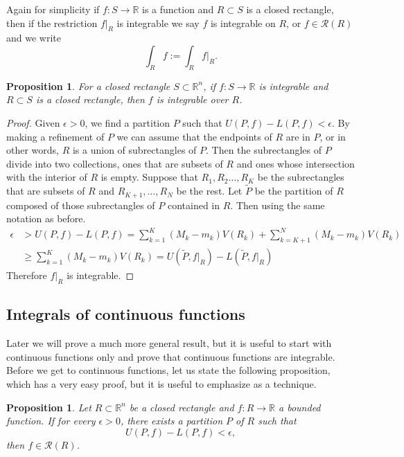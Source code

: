 \documentclass[12pt]{book}
\newcommand{\R}{{\mathbb{R}}}
\newcommand{\sR}{{\mathcal{R}}}
\theoremstyle{plain}
\newtheorem{prop}[thm]{Proposition}
\theoremstyle{remark}
\theoremstyle{definition}
\theoremstyle{exercise}
\theoremstyle{example}
\begin{document}
Again for simplicity if $f \colon S \to \R$ is a function and $R \subset S$
is a closed rectangle, then if the restriction $f|_R$ is integrable we
say $f$ is integrable on $R$, or $f \in \sR(R)$ and we
write
\begin{equation*}
\int_R f := \int_R f|_R .
\end{equation*}

\begin{prop}
For a closed rectangle $S \subset \R^n$,
if $f \colon S \to \R$ is integrable and $R \subset S$
is a closed rectangle, then $f$ is integrable over $R$.
\end{prop}

\begin{proof}
Given $\epsilon > 0$, we find a partition $P$ such that
$U(P,f)-L(P,f) < \epsilon$.  By making a refinement of $P$
we can assume that the endpoints of $R$ are in $P$, or in other words,
$R$ is a union of subrectangles of $P$.  Then the subrectangles of $P$
divide into two collections, ones that are subsets of $R$
and ones whose intersection with the interior of $R$ is empty.
Suppose that $R_1,R_2\ldots,R_K$ be the subrectangles that
are subsets of $R$ and $R_{K+1},\ldots, R_N$ be the rest.
Let $\widetilde{P}$ be the partition of $R$ composed of 
those subrectangles of $P$ contained in $R$.
Then using the same notation as before.
\begin{equation*}
\begin{split}
\epsilon & > 
U(P,f)-L(P,f)
=
\sum_{k=1}^K (M_k-m_k) V(R_k)
+
\sum_{k=K+1}^N (M_k-m_k) V(R_k)
\\
&
\geq
\sum_{k=1}^K (M_k-m_k) V(R_k)
=
U(\widetilde{P},f|_R)-L(\widetilde{P},f|_R)
\end{split}
\end{equation*}
Therefore $f|_R$ is integrable.
\end{proof}

\subsection{Integrals of continuous functions}

Later we will prove a much more general result, but it is useful to start
with continuous functions only and prove that continuous functions are
integrable.
Before we get to continuous functions,
let us state the following proposition, which has a very easy proof,
but it is useful to 
emphasize as a technique.

\begin{prop}
Let $R \subset \R^n$ be a closed rectangle and
$f \colon R \to \R$ a bounded function.
If for every $\epsilon > 0$, there exists a partition $P$ of $R$
such that
\begin{equation*}
U(P,f) - L(P,f) < \epsilon ,
\end{equation*}
then $f \in \sR(R)$.
\end{prop}
\end{document}
